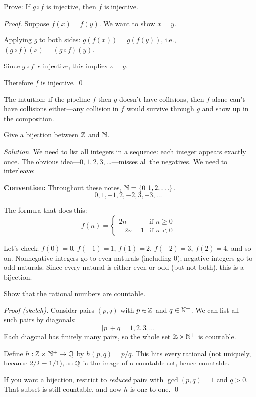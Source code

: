 \begin{example}
Prove: If $g \circ f$ is injective, then $f$ is injective.

\emph{Proof.} Suppose $f(x) = f(y)$. We want to show $x = y$.

Applying $g$ to both sides: $g(f(x)) = g(f(y))$, i.e., $(g \circ f)(x) = (g \circ f)(y)$.

Since $g \circ f$ is injective, this implies $x = y$.

Therefore $f$ is injective. \qed

The intuition: if the pipeline $f$ then $g$ doesn't have collisions, then $f$ alone can't have collisions either---any collision in $f$ would survive through $g$ and show up in the composition.
\end{example}

\begin{example}
Give a bijection between $\mathbb{Z}$ and $\mathbb{N}$.

\emph{Solution.} We need to list all integers in a sequence: each integer appears exactly once. The obvious idea---$0, 1, 2, 3, \ldots$---misses all the negatives. We need to interleave:
\par\noindent\textbf{Convention:} Throughout these notes, $\mathbb{N} = \{0, 1, 2, \ldots\}$.
\[
0, 1, -1, 2, -2, 3, -3, \ldots
\]

The formula that does this:
\[
f(n) = \begin{cases}
2n & \text{if } n \geq 0 \\
-2n - 1 & \text{if } n < 0
\end{cases}
\]

Let's check: $f(0) = 0$, $f(-1) = 1$, $f(1) = 2$, $f(-2) = 3$, $f(2) = 4$, and so on. Nonnegative integers go to even naturals (including 0); negative integers go to odd naturals. Since every natural is either even or odd (but not both), this is a bijection.
\end{example}

\begin{example}[Countability of $\Q$]
Show that the rational numbers are countable.

\emph{Proof (sketch).} Consider pairs $(p, q)$ with $p \in \mathbb{Z}$ and $q \in \mathbb{N}^+$. We can list all such pairs by diagonals:
\[
|p| + q = 1, 2, 3, \ldots
\]
Each diagonal has finitely many pairs, so the whole set $\mathbb{Z} \times \mathbb{N}^+$ is countable.

Define $h: \mathbb{Z} \times \mathbb{N}^+ \to \mathbb{Q}$ by $h(p, q) = p/q$. This hits every rational (not uniquely, because $2/2 = 1/1$), so $\Q$ is the image of a countable set, hence countable.

If you want a bijection, restrict to \emph{reduced} pairs with $\gcd(p, q) = 1$ and $q > 0$. That subset is still countable, and now $h$ is one-to-one. \qed
\end{example}

